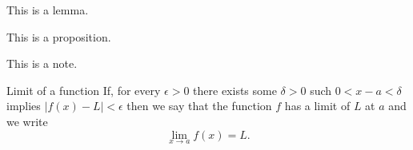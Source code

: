 \documentclass{MathNoteCN}
\begin{document}
	\begin{lemma}
		This is a lemma.
	\end{lemma}
	\begin{proposition}
		This is a proposition.
	\end{proposition}
	\begin{note}
		This is a note.
	\end{note}
		\begin{definition}{Limit of a function}{}
	If, for every $ \epsilon >0 $ there exists some $ \delta >0 $ such $ 0<x-a<\delta $ implies $ |f(x)-L|<\epsilon $ then we say that the function $ f $ has a limit of $ L $ at $ a $ and we write
	\[\lim_{x\to a}f(x)=L.\]
	\end{definition}
\end{document}
